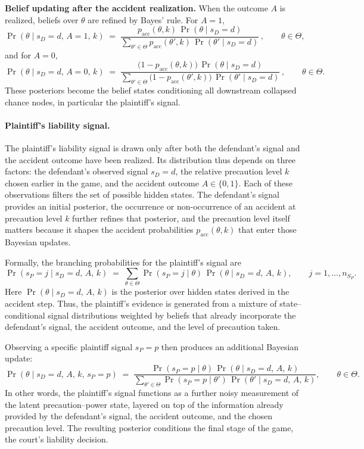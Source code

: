 \documentclass{article}
\begin{document}
\medskip
\noindent\textbf{Belief updating after the accident realization.}
When the outcome $A$ is realized, beliefs over $\theta$ are refined by Bayes’ rule. For $A=1$,
\[
\Pr(\theta \mid s_D=d,\,A=1,\,k)
\;=\;
\frac{p_{\mathrm{acc}}(\theta,k)\,\Pr(\theta \mid s_D=d)}
{\sum_{\theta'\in\Theta} p_{\mathrm{acc}}(\theta',k)\,\Pr(\theta' \mid s_D=d)}\,,
\qquad \theta\in\Theta,
\]
and for $A=0$,
\[
\Pr(\theta \mid s_D=d,\,A=0,\,k)
\;=\;
\frac{\bigl(1-p_{\mathrm{acc}}(\theta,k)\bigr)\,\Pr(\theta \mid s_D=d)}
{\sum_{\theta'\in\Theta} \bigl(1-p_{\mathrm{acc}}(\theta',k)\bigr)\,\Pr(\theta' \mid s_D=d)}\,,
\qquad \theta\in\Theta.
\]
These posteriors become the belief states conditioning all downstream collapsed chance nodes, in particular the plaintiff’s signal.

\paragraph{Plaintiff’s liability signal.}
The plaintiff’s liability signal is drawn only after both the defendant’s signal and the accident outcome have been realized. Its distribution thus depends on three factors: the defendant’s observed signal $s_D=d$, the relative precaution level $k$ chosen earlier in the game, and the accident outcome $A\in\{0,1\}$. Each of these observations filters the set of possible hidden states. The defendant’s signal provides an initial posterior, the occurrence or non-occurrence of an accident at precaution level $k$ further refines that posterior, and the precaution level itself matters because it shapes the accident probabilities $p_{\mathrm{acc}}(\theta,k)$ that enter those Bayesian updates.

Formally, the branching probabilities for the plaintiff’s signal are
\[
\Pr(s_P=j \mid s_D=d,\,A,\,k)
\;=\;\sum_{\theta\in\Theta} \Pr(s_P=j \mid \theta)\,\Pr(\theta \mid s_D=d,\,A,\,k),
\qquad j=1,\dots,n_{S_P}.
\]
Here $\Pr(\theta \mid s_D=d,\,A,\,k)$ is the posterior over hidden states derived in the accident step. Thus, the plaintiff’s evidence is generated from a mixture of state–conditional signal distributions weighted by beliefs that already incorporate the defendant’s signal, the accident outcome, and the level of precaution taken.

Observing a specific plaintiff signal $s_P=p$ then produces an additional Bayesian update:
\[
\Pr(\theta \mid s_D=d,\,A,\,k,\,s_P=p)
\;=\;
\frac{\Pr(s_P=p \mid \theta)\,\Pr(\theta \mid s_D=d,\,A,\,k)}
{\sum_{\theta'\in\Theta} \Pr(s_P=p \mid \theta')\,\Pr(\theta' \mid s_D=d,\,A,\,k)},
\qquad \theta\in\Theta.
\]
In other words, the plaintiff’s signal functions as a further noisy measurement of the latent precaution–power state, layered on top of the information already provided by the defendant’s signal, the accident outcome, and the chosen precaution level. The resulting posterior conditions the final stage of the game, the court’s liability decision.
\end{document}

